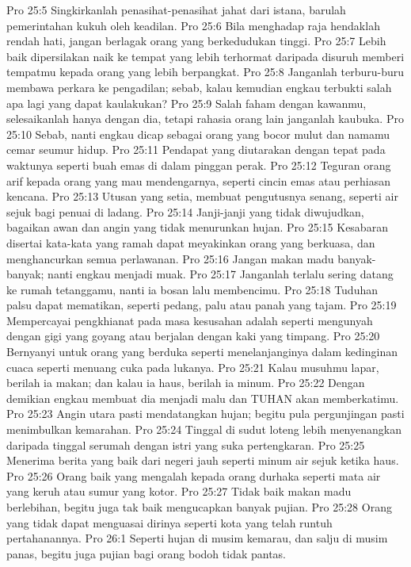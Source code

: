Pro 25:5  Singkirkanlah penasihat-penasihat jahat dari istana, barulah pemerintahan kukuh oleh keadilan.
Pro 25:6  Bila menghadap raja hendaklah rendah hati, jangan berlagak orang yang berkedudukan tinggi.
Pro 25:7  Lebih baik dipersilakan naik ke tempat yang lebih terhormat daripada disuruh memberi tempatmu kepada orang yang lebih berpangkat.
Pro 25:8  Janganlah terburu-buru membawa perkara ke pengadilan; sebab, kalau kemudian engkau terbukti salah apa lagi yang dapat kaulakukan?
Pro 25:9  Salah faham dengan kawanmu, selesaikanlah hanya dengan dia, tetapi rahasia orang lain janganlah kaubuka.
Pro 25:10  Sebab, nanti engkau dicap sebagai orang yang bocor mulut dan namamu cemar seumur hidup.
Pro 25:11  Pendapat yang diutarakan dengan tepat pada waktunya seperti buah emas di dalam pinggan perak.
Pro 25:12  Teguran orang arif kepada orang yang mau mendengarnya, seperti cincin emas atau perhiasan kencana.
Pro 25:13  Utusan yang setia, membuat pengutusnya senang, seperti air sejuk bagi penuai di ladang.
Pro 25:14  Janji-janji yang tidak diwujudkan, bagaikan awan dan angin yang tidak menurunkan hujan.
Pro 25:15  Kesabaran disertai kata-kata yang ramah dapat meyakinkan orang yang berkuasa, dan menghancurkan semua perlawanan.
Pro 25:16  Jangan makan madu banyak-banyak; nanti engkau menjadi muak.
Pro 25:17  Janganlah terlalu sering datang ke rumah tetanggamu, nanti ia bosan lalu membencimu.
Pro 25:18  Tuduhan palsu dapat mematikan, seperti pedang, palu atau panah yang tajam.
Pro 25:19  Mempercayai pengkhianat pada masa kesusahan adalah seperti mengunyah dengan gigi yang goyang atau berjalan dengan kaki yang timpang.
Pro 25:20  Bernyanyi untuk orang yang berduka seperti menelanjanginya dalam kedinginan cuaca seperti menuang cuka pada lukanya.
Pro 25:21  Kalau musuhmu lapar, berilah ia makan; dan kalau ia haus, berilah ia minum.
Pro 25:22  Dengan demikian engkau membuat dia menjadi malu dan TUHAN akan memberkatimu.
Pro 25:23  Angin utara pasti mendatangkan hujan; begitu pula pergunjingan pasti menimbulkan kemarahan.
Pro 25:24  Tinggal di sudut loteng lebih menyenangkan daripada tinggal serumah dengan istri yang suka pertengkaran.
Pro 25:25  Menerima berita yang baik dari negeri jauh seperti minum air sejuk ketika haus.
Pro 25:26  Orang baik yang mengalah kepada orang durhaka seperti mata air yang keruh atau sumur yang kotor.
Pro 25:27  Tidak baik makan madu berlebihan, begitu juga tak baik mengucapkan banyak pujian.
Pro 25:28  Orang yang tidak dapat menguasai dirinya seperti kota yang telah runtuh pertahanannya.
Pro 26:1  Seperti hujan di musim kemarau, dan salju di musim panas, begitu juga pujian bagi orang bodoh tidak pantas.
